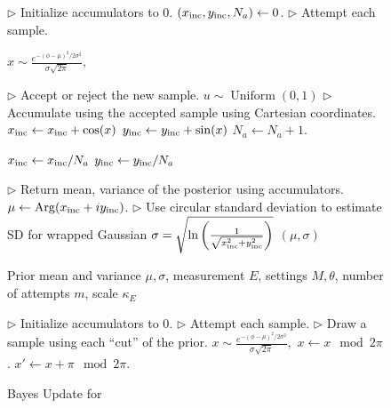 \documentclass[aps,pra,amsmath,twocolumn,amssymb,superscriptaddress]{revtex4-1}
\newcommand{\linecomment}[1]{\State \(\triangleright\) {\footnotesize #1} \normalsize}
\newcommand{\CRej}{\text{RejF }}
\begin{document}
{\begin{figure}[h]
\begin{algorithm}[H]
\begin{algorithmic}
        \linecomment{Initialize accumulators to 0.}
	\State $(x_{\rm inc},y_{\rm inc},N_a) \gets 0$.
        \linecomment{Attempt each sample.}

            \State $x \sim\frac{e^{-(\phi-\mu)^2/2 \sigma^2}}{\sigma\sqrt{2 \pi }},$
          
            \linecomment{Accept or reject the new sample.}
            \State $u \sim \operatorname{Uniform}(0, 1)$
                \linecomment{Accumulate using the accepted sample using Cartesian coordinates.}
                \State $x_{\rm inc} \gets x_{\rm inc}+ \cos(x)$
                \State $y_{\rm inc} \gets y_{\rm inc}+ \sin(x)$
                \State $N_a \gets N_a +1$.
            \EndIf
        \EndFor

        \State $x_{\rm inc}\gets x_{\rm inc}/N_a $
        \State $y_{\rm inc}\gets y_{\rm inc}/N_a $

        \linecomment{Return mean, variance of the posterior using accumulators.}
	\State $\mu\gets {\rm Arg}(x_{\rm inc}+iy_{\rm inc})$.
\linecomment{Use circular standard deviation to estimate SD for wrapped Gaussian}
	\State $\sigma = \sqrt{\ln\left(\frac{1}{\sqrt{x_{\rm inc}^2 + y_{\rm inc}^2}}\right)}$
        \State\Return $(\mu,\sigma)$

    \end{algorithmic}
\end{algorithm}
\end{figure}

\begin{figure}[h]
\begin{algorithm}[H]
    \caption{Bayes Update for \CRej}
    \label{alg:crej}
    \begin{algorithmic}

        \Require Prior mean and variance $\mu,\sigma$, measurement $E$,
            settings $M,\theta$, number of attempts $m$, scale $\kappa_E$

        \linecomment{Initialize accumulators to 0.}
        \linecomment{Attempt each sample.}
            \linecomment{Draw a sample using each ``cut'' of the prior.}
            \State $x \sim\frac{e^{-(\phi-\mu)^2/2 \sigma^2}}{\sigma\sqrt{2 \pi }},$
            \State $x\gets x \mod 2 \pi$.
            \State $x'\gets x+\pi \mod 2 \pi$.


\end{algorithmic}
\end{algorithm}
\end{figure}}
\end{document}
